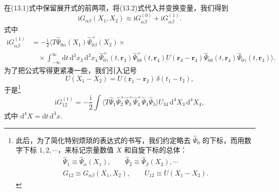 在(13.1)式中保留展开式的前两项，将(13.2)式代入并变换变量，我们得到
\begin{equation*}
\mathrm{i}G_{\alpha\beta}(X_1,X_2)\approx\mathrm{i}G^{(0)}_{\alpha\beta}+\mathrm{i}G^{(1)}_{\alpha\beta}.
\end{equation*}
式中
\begin{equation*}
\begin{aligned}
\mathrm{i}G^{(1)}_{\alpha\beta}&=-\frac{\mathrm{i}}{2}\big\langle T\hat\Psi_{0\alpha}(X_1)\hat\Psi^{+}_{0\beta}(X_2)\times\\
&\quad\times\int_{-\infty}^{\infty}\mathrm{d}t\,\mathrm{d}^3x_3\,\mathrm{d}^3x_4\,\hat\Psi^{+}_{0\gamma}(t,\bm r_3)\hat\Psi^{+}_{0\delta}(t,\bm r_4)U(\bm r_3-\bm r_4)\hat\Psi_{0\delta}(t,\bm r_4)\hat\Psi_{0\gamma}(t,\bm r_3)\big\rangle.
\end{aligned}
\end{equation*}
为了把公式写得更紧凑一些，我们引入记号
\begin{equation}
U(X_1-X_2)=U(\bm r_1-\bm r_2)\,\delta(t_1-t_2),
\end{equation}
于是\footnote{此后，为了简化特别烦琐的表达式的书写，我们约定略去 $\hat\Psi_{0}$ 的下标，而用数字下标 $1,2,\cdots$，来标记宗量数值 $X$ 和自旋下标的总体：
\begin{gather*}
\hat\Psi_{1}\equiv\hat\Psi_{\alpha}(X_{1}),\qquad
\hat\Psi_{2}\equiv\hat\Psi_{\beta}(X_{2}),\cdots\\
G_{12}\equiv G_{\alpha\beta}(X_{1},X_{2}),\qquad
U_{12}\equiv U(X_{1}-X_{2}).
\end{gather*}}
\begin{equation*}
\mathrm{i}G^{(1)}_{12}=-\frac{\mathrm{i}}{2}\int\big\langle T\hat\Psi_1\hat\Psi^{+}_2\hat\Psi^{+}_3\hat\Psi^{+}_4\hat\Psi_4\hat\Psi_3\big\rangle U_{34}\,\mathrm{d}^4X_3\,\mathrm{d}^4X_4,
\end{equation*}
式中 $\mathrm{d}^4X=\mathrm{d}t\,\mathrm{d}^3x$.

